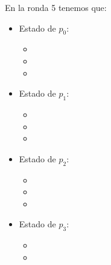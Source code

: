 En la ronda 5 tenemos que:

\begin{multicols}{2}
\begin{itemize}
\item Estado de $p_0$:
      \begin{itemize}
      \item {}
      
      \item {}
      
      \item {}
      \end{itemize}
      
\item Estado de $p_1$:
      \begin{itemize}
      \item {}
      
      \item {}
      
      \item {}
      \end{itemize}

\item Estado de $p_2$:
      \begin{itemize}
      \item {}
      
      \item {}
      
      \item {}
      \end{itemize}

\item Estado de $p_3$:
      \begin{itemize}
      \item {}
      
      \item {}
      

\end{itemize}
\end{itemize}
\end{multicols}
